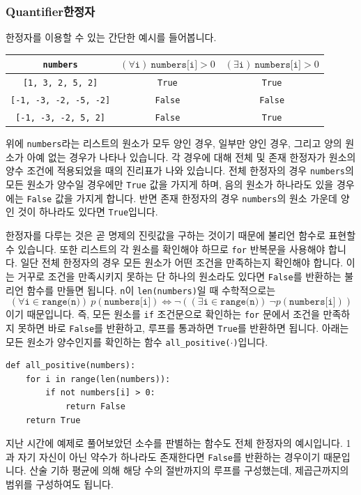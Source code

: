 \documentclass[../main.tex]{subfiles}
\begin{document}
\subsubsection{Quantifier한정자}
한정자를 이용할 수 있는 간단한 예시를 들어봅니다.
\begin{table}[H]
    \centering
    \begin{tabular}{c|c|c}
        \texttt{numbers} & $(\forall \texttt{i})\ \texttt{numbers[i]}>0$ & $(\exists \texttt{i})\ \texttt{numbers[i]}>0$\\ \hline
        \texttt{[1, 3, 2, 5, 2]} & \texttt{True} & \texttt{True}\\
        \texttt{[-1, -3, -2, -5, -2]} & \texttt{False} & \texttt{False} \\
        \texttt{[-1, -3, -2, 5, 2]} & \texttt{False} & \texttt{True}
    \end{tabular}
\end{table}
위에 \texttt{numbers}라는 리스트의 원소가 모두 양인 경우, 일부만 양인 경우, 그리고 양의 원소가 아예 없는 경우가 나타나 있습니다.
각 경우에 대해 전체 및 존재 한정자가 원소의 양수 조건에 적용되었을 때의 진리표가 나와 있습니다.
전체 한정자의 경우 \texttt{numbers}의 모든 원소가 양수일 경우에만 \texttt{True} 값을 가지게 하며, 음의 원소가 하나라도 있을 경우에는 \texttt{False} 값을 가지게 합니다.
반면 존재 한정자의 경우 \texttt{numbers}의 원소 가운데 양인 것이 하나라도 있다면 \texttt{True}입니다.

한정자를 다루는 것은 곧 명제의 진릿값을 구하는 것이기 때문에 불리언 함수로 표현할 수 있습니다.
또한 리스트의 각 원소를 확인해야 하므로 \texttt{for} 반복문을 사용해야 합니다.
일단 전체 한정자의 경우 모든 원소가 어떤 조건을 만족하는지 확인해야 합니다.
이는 거꾸로 조건을 만족시키지 못하는 단 하나의 원소라도 있다면 \texttt{False}를 반환하는 불리언 함수를 만들면 됩니다.
\texttt{n}이 \texttt{len(numbers)}일 때 수학적으로는
\[
(\forall \texttt{i} \in \texttt{range(n)})\ p(\texttt{numbers[i]}) \Leftrightarrow \neg\left((\exists \texttt{i} \in \texttt{range(n)})\ \neg p(\texttt{numbers[i]})\right)
\]
이기 때문입니다.
즉, 모든 원소를  \texttt{if} 조건문으로 확인하는 \texttt{for} 문에서 조건을 만족하지 못하면 바로 \texttt{False}를 반환하고, 루프를 통과하면 \texttt{True}를 반환하면 됩니다.
아래는 모든 원소가 양수인지를 확인하는 함수 \texttt{all\_positive($\cdot$)}입니다.
\begin{verbatim}
def all_positive(numbers):
	for i in range(len(numbers)):
		if not numbers[i] > 0:
			return False
	return True
\end{verbatim}
지난 시간에 예제로 풀어보았던 소수를 판별하는 함수도 전체 한정자의 예시입니다.
1과 자기 자신이 아닌 약수가 하나라도 존재한다면 \texttt{False}를 반환하는 경우이기 때문입니다.
산술 기하 평균에 의해 해당 수의 절반까지의 루프를 구성했는데, 제곱근까지의 범위를 구성하여도 됩니다.
\end{document}
